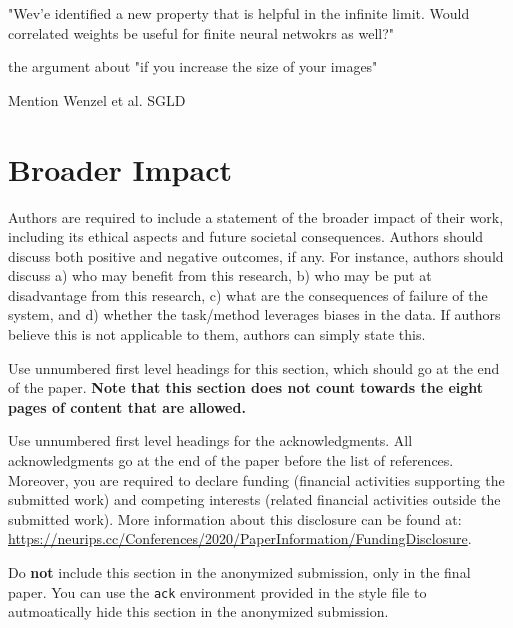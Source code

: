 \documentclass{article}
\theoremstyle{definition}
\begin{document}
"Wev'e identified a new property that is helpful in the infinite limit. Would correlated weights be useful for finite neural netwokrs as well?"

the argument about "if you increase the size of your images" 

Mention Wenzel et al. SGLD

\section*{Broader Impact}

Authors are required to include a statement of the broader impact of their work, including its ethical aspects and future societal consequences. 
Authors should discuss both positive and negative outcomes, if any. For instance, authors should discuss a) 
who may benefit from this research, b) who may be put at disadvantage from this research, c) what are the consequences of failure of the system, and d) whether the task/method leverages
biases in the data. If authors believe this is not applicable to them, authors can simply state this.

Use unnumbered first level headings for this section, which should go at the end of the paper. {\bf Note that this section does not count towards the eight pages of content that are allowed.}

\begin{ack}
Use unnumbered first level headings for the acknowledgments. All acknowledgments
go at the end of the paper before the list of references. Moreover, you are required to declare 
funding (financial activities supporting the submitted work) and competing interests (related financial activities outside the submitted work). 
More information about this disclosure can be found at: \url{https://neurips.cc/Conferences/2020/PaperInformation/FundingDisclosure}.


Do {\bf not} include this section in the anonymized submission, only in the final paper. You can use the \texttt{ack} environment provided in the style file to autmoatically hide this section in the anonymized submission.
\end{ack}

\printbibliography

\newpage


\end{document}
